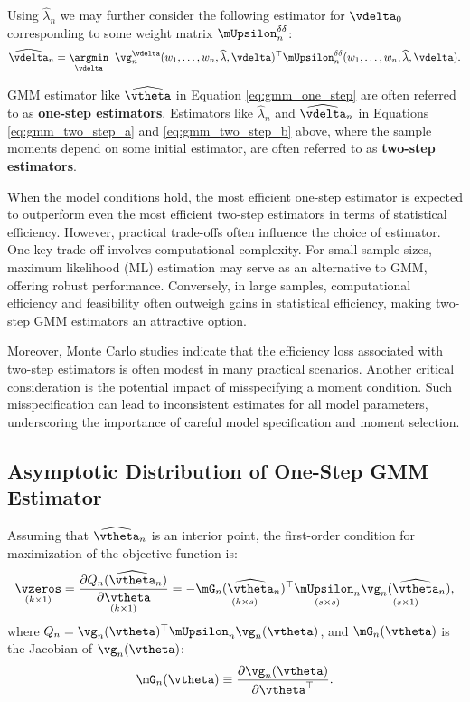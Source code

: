 \documentclass[english,12pt]{book}\usepackage[]{graphicx}\usepackage[]{xcolor}
\begin{document}
Using $\widehat{\lambda}_n$ we may further consider the following estimator for $\vdelta_0$ corresponding to some weight matrix $\mUpsilon^{\delta\delta}_n$:
\begin{equation}\label{eq:gmm_two_step_b}
\widehat{\vdelta}_n = \underset{\vdelta}{\argmin}\;\;\vg_n^{\vdelta}(w_1,\ldots,w_n, \widehat{\lambda}, \vdelta)^\top\mUpsilon^{\delta\delta}_n(w_1,\ldots,w_n, \widehat{\lambda}, \vdelta).
\end{equation}

GMM estimator like $\widehat{\vtheta}$ in Equation \eqref{eq:gmm_one_step} are often referred to as \textbf{one-step estimators}. Estimators like $\widehat{\lambda}_n$ and $\widehat{\vdelta}_n$ in Equations \eqref{eq:gmm_two_step_a} and \eqref{eq:gmm_two_step_b} above, where the sample moments depend on some initial estimator, are often referred to as \textbf{two-step estimators}.

When the model conditions hold, the most efficient one-step estimator is expected to outperform even the most efficient two-step estimators in terms of statistical efficiency. However, practical trade-offs often influence the choice of estimator. One key trade-off involves computational complexity. For small sample sizes, maximum likelihood (ML) estimation may serve as an alternative to GMM, offering robust performance. Conversely, in large samples, computational efficiency and feasibility often outweigh gains in statistical efficiency, making two-step GMM estimators an attractive option.

Moreover, Monte Carlo studies indicate that the efficiency loss associated with two-step estimators is often modest in many practical scenarios. Another critical consideration is the potential impact of misspecifying a moment condition. Such misspecification can lead to inconsistent estimates for all model parameters, underscoring the importance of careful model specification and moment selection.

\subsection{Asymptotic Distribution of One-Step GMM Estimator}\label{sec:gmm-one-step}

Assuming that $\widehat{\vtheta}_n$ is an interior point, the first-order condition for maximization of the objective function is:
\begin{equation}\label{eq:foc_review}
  \underset{(k\times 1)}{\vzeros} = \underset{(k\times 1)}{\frac{\partial Q_n(\widehat{\vtheta}_n)}{\partial \vtheta}} = - \underset{(k\times s)}{\mG_n(\widehat{\vtheta}_n)^\top}\underset{(s\times s)}{\mUpsilon_n}\underset{(s\times 1)}{\vg_n(\widehat{\vtheta}_n)},
\end{equation}
%
where $Q_n = \vg_n(\vtheta)^\top\mUpsilon_n\vg_n(\vtheta)$, and $\mG_n(\vtheta)$ is the Jacobian of $\vg_n(\vtheta)$:
\begin{equation*}
  \mG_n(\vtheta) \equiv  \frac{\partial \vg_n(\vtheta)}{\partial \vtheta^\top}.
\end{equation*}
\end{document}
